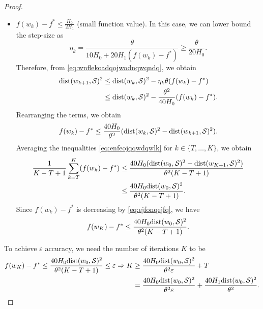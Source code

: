\documentclass[a4paper,11pt]{article}
\newcommand{\cS}{\mathcal{S}}
\newcommand{\1}{\mathbbm{1}}
\theoremstyle{plain}
\begin{document}
\begin{proof}
\begin{itemize}
        \item  $f(w_k) - f^* \le \frac{H_0}{2H_1}$ (small function value). In this case, we can lower bound the step-size as 
        \[
            \eta_k = \frac{\theta}{10H_0+20H_1(f(w_k)-f^*)} \ge \frac{\theta}{20H_0}.
        \]
        Therefore, from \eqref{eq:wnflekoadqojwodnqwqndq}, we obtain
        \begin{align*}
             {\rm dist}(w_{k+1},\cS)^2 &\le {\rm dist}(w_k,\cS)^2 - \eta_k\theta(f(w_k)-f^*) \\
             &\le {\rm dist}(w_k,\cS)^2 - \frac{\theta^2}{40H_0}(f(w_k)-f^*).
        \end{align*}
        Rearranging the terms, we obtain  
        \begin{align}\label{eq:enfeojqqwdqwlk}
            f(w_k) - f^* \le \frac{40H_0}{\theta^2}({\rm dist}(w_k,\cS)^2 - {\rm dist}(w_{k+1},\cS)^2).
        \end{align}
        Averaging the inequalities \eqref{eq:enfeojqqwdqwlk} for $k\in\{T,\dots, K\}$, we obtain 
        \begin{align*}
        \frac{1}{K-T+1}\sum_{k=T}^{K}(f(w_k)-f^*) &\le \frac{40H_0({\rm dist}(w_0,\cS)^2-{\rm dist}(w_{K+1},\cS)^2)}{\theta^2(K-T+1)} \\
        &\le \frac{40H_0{\rm dist}(w_0,\cS)^2}{\theta^2(K-T+1)}.
        \end{align*}
        Since $f(w_k)-f^*$ is decreasing by \eqref{eq:ejfonqejfq}, we have
        \[
        f(w_K) - f^* \le \frac{40H_0{\rm dist}(w_0,\cS)^2}{\theta^2(K-T+1)}.
        \]
    \end{itemize}
    To achieve $\varepsilon$ accuracy, we need the number of iterations $K$ to be
    \begin{align*}
        f(w_K) - f^* \le \frac{40H_0{\rm dist}(w_0,\cS)^2}{\theta^2(K-T+1)} \le \varepsilon \Rightarrow K &\ge \frac{40H_0{\rm dist}(w_0,\cS)^2}{\theta^2\varepsilon} + T\\
        &= \frac{40H_0{\rm dist}(w_0,\cS)^2}{\theta^2\varepsilon} + \frac{40H_1{\rm dist}(w_0,\cS)^2}{\theta^2}. 
    \end{align*}
\end{proof}
\end{document}

